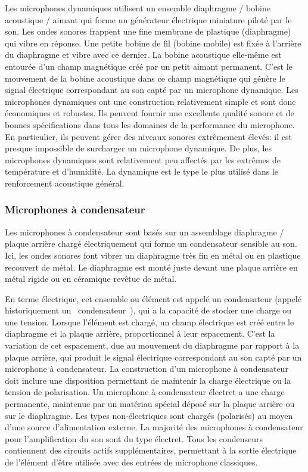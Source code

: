 \documentclass[a4paper, 12pt]{book}
\begin{document}
Les microphones dynamiques utilisent un ensemble diaphragme / bobine acoustique / aimant qui forme un générateur électrique miniature piloté par le son. Les ondes sonores frappent une fine membrane de plastique (diaphragme) qui vibre en réponse. Une petite bobine de fil (bobine mobile) est fixée à l'arrière du diaphragme et vibre avec ce dernier. La bobine acoustique elle-même est entourée d'un champ magnétique créé par un petit aimant permanent. C'est le mouvement de la bobine acoustique dans ce champ magnétique qui génère le signal électrique correspondant au son capté par un microphone dynamique. Les microphones dynamiques ont une construction relativement simple et sont donc économiques et robustes. Ils peuvent fournir une excellente qualité sonore et de bonnes spécifications dans tous les domaines de la performance du microphone. En particulier, ils peuvent gérer des niveaux sonores extrêmement élevés: il est presque impossible de surcharger un microphone dynamique. De plus, les microphones dynamiques sont relativement peu affectés par les extrêmes de température et d'humidité. La dynamique est le type le plus utilisé dans le renforcement acoustique général.


\subsubsection{Microphones à condensateur}

Les microphones à condensateur sont basés sur un assemblage diaphragme / plaque arrière chargé électriquement qui forme un condensateur sensible au son. Ici, les ondes sonores font vibrer un diaphragme très fin en métal ou en plastique recouvert de métal. Le diaphragme est monté juste devant une plaque arrière en métal rigide ou en céramique revêtue de métal. 

En terme électrique, cet ensemble ou élément est appelé un condensateur (appelé historiquement un \guillemotleft{}~condensateur~\guillemotright{}), qui a la capacité de stocker une charge ou une tension. Lorsque l'élément est chargé, un champ électrique est créé entre le diaphragme et la plaque arrière, proportionnel à leur espacement. C'est la variation de cet espacement, due au mouvement du diaphragme par rapport à la plaque arrière, qui produit le signal électrique correspondant au son capté par un microphone à condensateur. La construction d’un microphone à condensateur doit inclure une disposition permettant de maintenir la charge électrique ou la tension de polarisation. Un microphone à condensateur électret a une charge permanente, maintenue par un matériau spécial déposé sur la plaque arrière ou sur le diaphragme. Les types non-électriques sont chargés (polarisés) au moyen d'une source d'alimentation externe. La majorité des microphones à condensateur pour l’amplification du son sont du type électret. Tous les condenseurs contiennent des circuits actifs supplémentaires, permettant à la sortie électrique de l'élément d'être utilisée avec des entrées de microphone classiques. 
\end{document}
